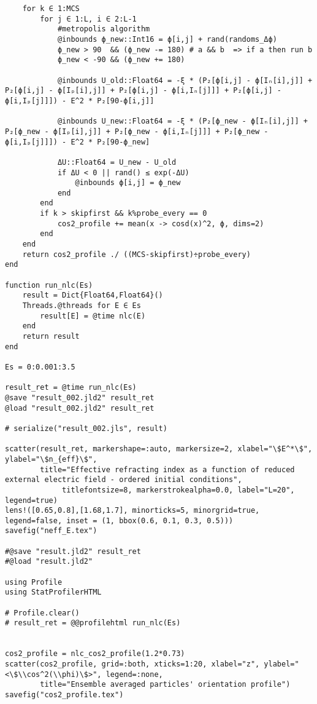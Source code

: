 \documentclass[11pt]{article}
\begin{document}
\begin{verbatim}
    for k ∈ 1:MCS
        for j ∈ 1:L, i ∈ 2:L-1
            #metropolis algorithm
            @inbounds ϕ_new::Int16 = ϕ[i,j] + rand(randoms_Δϕ)
            ϕ_new > 90  && (ϕ_new -= 180) # a && b  => if a then run b
            ϕ_new < -90 && (ϕ_new += 180)

            @inbounds U_old::Float64 = -ξ * (P₂[ϕ[i,j] - ϕ[Iₙ[i],j]] + P₂[ϕ[i,j] - ϕ[Iₚ[i],j]] + P₂[ϕ[i,j] - ϕ[i,Iₙ[j]]] + P₂[ϕ[i,j] - ϕ[i,Iₚ[j]]]) - E^2 * P₂[90-ϕ[i,j]]
            
            @inbounds U_new::Float64 = -ξ * (P₂[ϕ_new - ϕ[Iₙ[i],j]] + P₂[ϕ_new - ϕ[Iₚ[i],j]] + P₂[ϕ_new - ϕ[i,Iₙ[j]]] + P₂[ϕ_new - ϕ[i,Iₚ[j]]]) - E^2 * P₂[90-ϕ_new]

            ΔU::Float64 = U_new - U_old
            if ΔU < 0 || rand() ≤ exp(-ΔU)
                @inbounds ϕ[i,j] = ϕ_new
            end
        end
        if k > skipfirst && k%probe_every == 0
            cos2_profile += mean(x -> cosd(x)^2, ϕ, dims=2)
        end
    end
    return cos2_profile ./ ((MCS-skipfirst)÷probe_every)
end

function run_nlc(Es)
    result = Dict{Float64,Float64}()
    Threads.@threads for E ∈ Es
        result[E] = @time nlc(E)
    end
    return result
end

Es = 0:0.001:3.5

result_ret = @time run_nlc(Es)
@save "result_002.jld2" result_ret
@load "result_002.jld2" result_ret

# serialize("result_002.jls", result)

scatter(result_ret, markershape=:auto, markersize=2, xlabel="\$E^*\$", ylabel="\$n_{eff}\$",
        title="Effective refracting index as a function of reduced external electric field - ordered initial conditions",
             titlefontsize=8, markerstrokealpha=0.0, label="L=20",  legend=true)
lens!([0.65,0.8],[1.68,1.7], minorticks=5, minorgrid=true, legend=false, inset = (1, bbox(0.6, 0.1, 0.3, 0.5)))
savefig("neff_E.tex")

#@save "result.jld2" result_ret
#@load "result.jld2"

using Profile
using StatProfilerHTML

# Profile.clear()
# result_ret = @@profilehtml run_nlc(Es)


cos2_profile = nlc_cos2_profile(1.2*0.73)
scatter(cos2_profile, grid=:both, xticks=1:20, xlabel="z", ylabel="<\$\\cos^2(\\phi)\$>", legend=:none,
        title="Ensemble averaged particles' orientation profile")
savefig("cos2_profile.tex")
\end{verbatim}
\end{document}
